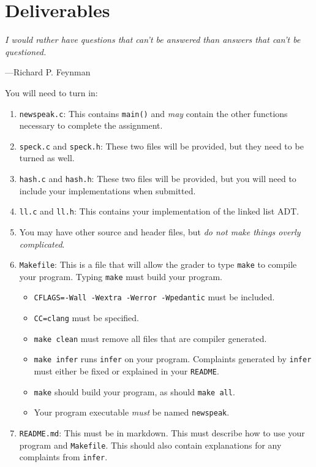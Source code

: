 \documentclass{article}
\begin{document}

\section{Deliverables}
\epigraph{\emph{I would rather have questions that can't be answered than
answers that can't be questioned.}}{---Richard P. Feynman}

You will need to turn in:

\begin{enumerate}
\item \texttt{newspeak.c}: This contains \texttt{main()} and \emph{may} contain the other functions necessary to complete the assignment.
\item \texttt{speck.c} and \texttt{speck.h}: These two files will be provided, but they need to be turned as well.
\item \texttt{hash.c} and \texttt{hash.h}: These two files will be provided, but you will need to include your implementations when submitted.
\item \texttt{ll.c} and \texttt{ll.h}: This contains your implementation of the linked list ADT.
\item You may have other source and header files, but \emph{do not make things overly complicated}.

\item \texttt{Makefile}: This is a file that will allow the grader
to type \texttt{make} to compile your program. Typing \texttt{make} must build your program.
\begin{itemize}
\item \texttt{CFLAGS=-Wall -Wextra -Werror -Wpedantic} must be included.
        \item \texttt{CC=clang} must be specified.
        \item \texttt{make clean} must remove all files that are compiler generated.
    \item \texttt{make infer} runs \texttt{infer} on your program. Complaints
        generated by \texttt{infer} must either be fixed or explained in your
        \texttt{README}.
        \item \texttt{make} should build your program, as should \texttt{make all}.
        \item Your program executable \emph{must} be named \texttt{newspeak}.
        \end{itemize}

\item \texttt{README.md}: This must be in markdown. This must describe how to
    use your program and \texttt{Makefile}. This should also contain
    explanations for any complaints from \texttt{infer}.


\end{enumerate}
\end{document}
